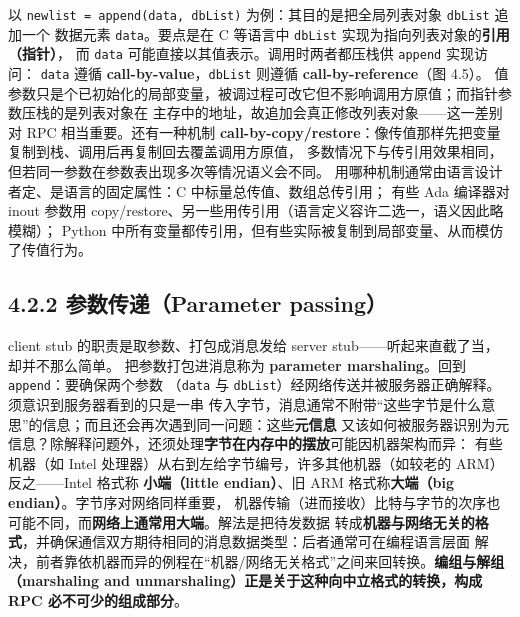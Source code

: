 \begin{ideabox}
以 \texttt{newlist = append(data, dbList)} 为例：其目的是把全局列表对象 \texttt{dbList} 追加一个
数据元素 \texttt{data}。要点是在 C 等语言中 \texttt{dbList} 实现为指向列表对象的\textbf{引用（指针）}，
而 \texttt{data} 可能直接以其值表示。调用时两者都压栈供 \texttt{append} 实现访问：
\texttt{data} 遵循 \textbf{call-by-value}，\texttt{dbList} 则遵循 \textbf{call-by-reference}（图 4.5）。
值参数只是个已初始化的局部变量，被调过程可改它但不影响调用方原值；而指针参数压栈的是列表对象在
主存中的地址，故追加会真正修改列表对象——这一差别对 RPC 相当重要。还有一种机制
\textbf{call-by-copy/restore}：像传值那样先把变量复制到栈、调用后再复制回去覆盖调用方原值，
多数情况下与传引用效果相同，但若同一参数在参数表出现多次等情况语义会不同。
用哪种机制通常由语言设计者定、是语言的固定属性：C 中标量总传值、数组总传引用；
有些 Ada 编译器对 inout 参数用 copy/restore、另一些用传引用（语言定义容许二选一，语义因此略模糊）；
Python 中所有变量都传引用，但有些实际被复制到局部变量、从而模仿了传值行为。
\end{ideabox}

\begin{closeread}
\end{closeread}


\subsection*{4.2.2 参数传递（Parameter passing）}
client stub 的职责是取参数、打包成消息发给 server stub——听起来直截了当，却并不那么简单。
把参数打包进消息称为 \textbf{parameter marshaling}。回到 \texttt{append}：要确保两个参数
（\texttt{data} 与 \texttt{dbList}）经网络传送并被服务器正确解释。须意识到服务器看到的只是一串
传入字节，消息通常不附带“这些字节是什么意思”的信息；而且还会再次遇到同一问题：这些\textbf{元信息}
又该如何被服务器识别为元信息？除解释问题外，还须处理\textbf{字节在内存中的摆放}可能因机器架构而异：
有些机器（如 Intel 处理器）从右到左给字节编号，许多其他机器（如较老的 ARM）反之——Intel 格式称
\textbf{小端（little endian）}、旧 ARM 格式称\textbf{大端（big endian）}。字节序对网络同样重要，
机器传输（进而接收）比特与字节的次序也可能不同，而\textbf{网络上通常用大端}。解法是把待发数据
转成\textbf{机器与网络无关的格式}，并确保通信双方期待相同的消息数据类型：后者通常可在编程语言层面
解决，前者靠依机器而异的例程在“机器/网络无关格式”之间来回转换。\textbf{编组与解组（marshaling and
unmarshaling）正是关于这种向中立格式的转换，构成 RPC 必不可少的组成部分}。

